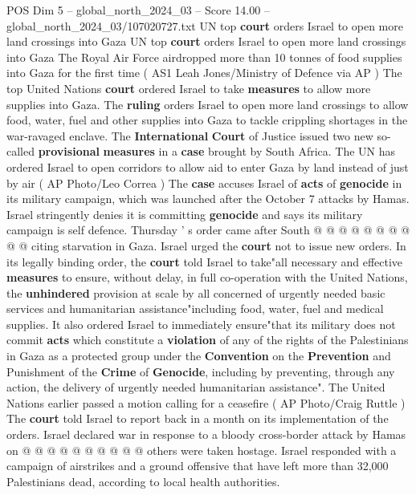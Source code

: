 \begin{textsample}{POS Dim 5 – global\_north\_2024\_03 – Score 14.00 – global\_north\_2024\_03/107020727.txt}  \label{ex:f5_pos_294}
UN top \textbf{court} orders Israel to open more land crossings into Gaza UN top \textbf{court} orders Israel to open more land crossings into Gaza The Royal Air Force airdropped more than 10 tonnes of food supplies into Gaza for the first time ( AS1 Leah Jones/Ministry of Defence via AP ) The top United Nations \textbf{court} ordered Israel to take \textbf{measures} to allow more supplies into Gaza.
The \textbf{ruling} orders Israel to open more land crossings to allow food, water, fuel and other supplies into Gaza to tackle crippling shortages in the war-ravaged enclave.
The \textbf{International} \textbf{Court} of Justice issued two new so-called \textbf{provisional} \textbf{measures} in a \textbf{case} brought by South Africa.
The UN has ordered Israel to open corridors to allow aid to enter Gaza by land instead of just by air ( AP Photo/Leo Correa ) The \textbf{case} accuses Israel of \textbf{acts} of \textbf{genocide} in its military campaign, which was launched after the October 7 attacks by Hamas.
Israel stringently denies it is committing \textbf{genocide} and says its military campaign is self defence.
Thursday ' s order came after South @ @ @ @ @ @ @ @ @ @ citing starvation in Gaza.
Israel urged the \textbf{court} not to issue new orders.
In its legally binding order, the \textbf{court} told Israel to take"all necessary and effective \textbf{measures} to ensure, without delay, in full co-operation with the United Nations, the \textbf{unhindered} provision at scale by all concerned of urgently needed basic services and humanitarian assistance"including food, water, fuel and medical supplies.
It also ordered Israel to immediately ensure"that its military does not commit \textbf{acts} which constitute a \textbf{violation} of any of the rights of the Palestinians in Gaza as a protected group under the \textbf{Convention} on the \textbf{Prevention} and Punishment of the \textbf{Crime} of \textbf{Genocide}, including by preventing, through any action, the delivery of urgently needed humanitarian assistance".
The United Nations earlier passed a motion calling for a ceasefire ( AP Photo/Craig Ruttle ) The \textbf{court} told Israel to report back in a month on its implementation of the orders.
Israel declared war in response to a bloody cross-border attack by Hamas on @ @ @ @ @ @ @ @ @ @ others were taken hostage.
Israel responded with a campaign of airstrikes and a ground offensive that have left more than 32,000 Palestinians dead, according to local health authorities.

\end{textsample}
